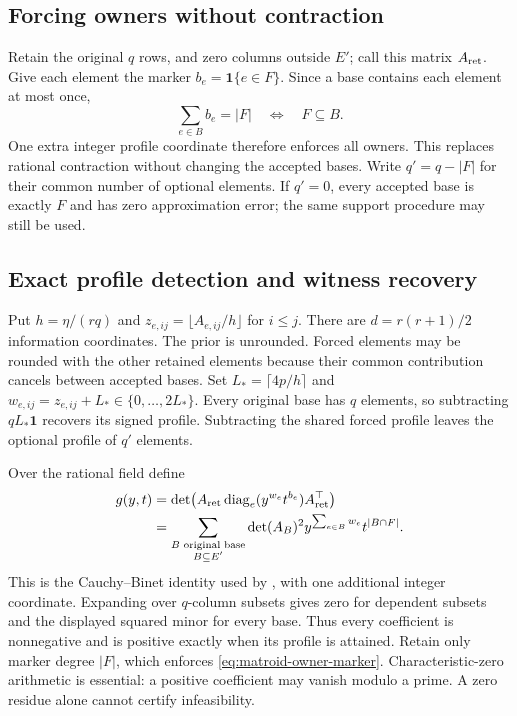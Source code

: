 \subsection{Forcing owners without contraction}
Retain the original $q$ rows, and zero columns outside $E'$; call this
matrix $A_{\rm ret}$. Give each element the marker
$b_e=\mathbf1\{e\in F\}$. Since a base contains each element at most once,
\begin{equation}
 \sum_{e\in B}b_e=|F|
 \quad\Longleftrightarrow\quad F\subseteq B.
 \label{eq:matroid-owner-marker}
\end{equation}
One extra integer profile coordinate therefore enforces all owners.
This replaces rational contraction without changing the accepted bases.
Write $q'=q-|F|$ for their common number of optional elements. If $q'=0$,
every accepted base is exactly $F$ and has zero approximation error; the
same support procedure may still be used.

\subsection{Exact profile detection and witness recovery}
Put $h=\eta/(rq)$ and $z_{e,ij}=\lfloor A_{e,ij}/h\rfloor$ for $i\le j$.
There are $d=r(r+1)/2$ information coordinates. The prior is unrounded.
Forced elements may be rounded with the other retained elements because
their common contribution cancels between accepted bases. Set
$L_* =\lceil4p/h\rceil$ and
$w_{e,ij}=z_{e,ij}+L_*\in\{0,\ldots,2L_*\}$.
Every original base has $q$ elements, so subtracting $qL_*\mathbf1$
recovers its signed profile. Subtracting the shared forced profile leaves
the optional profile of $q'$ elements.

Over the rational field define
\begin{equation}
\begin{split}
 g(y,t)&=\det\!\left(A_{\rm ret}
               \operatorname{diag}_e(y^{w_e}t^{b_e})A_{\rm ret}^{\top}\right)\\
 &=\sum_{\substack{B\text{ original base}\\B\subseteq E'}}
       \det(A_B)^2 y^{\sum_{e\in B}w_e}t^{|B\cap F|}.
\end{split}
 \label{eq:matroid-profile-polynomial}
\end{equation}
This is the Cauchy--Binet identity used by
\citet[Lemmas 4.3--4.4]{Berstein2008}, with one additional integer
coordinate. Expanding over $q$-column subsets gives zero for dependent
subsets and the displayed squared minor for every base. Thus every
coefficient is nonnegative and is positive exactly when its profile is
attained. Retain only marker degree $|F|$, which enforces
\eqref{eq:matroid-owner-marker}. Characteristic-zero arithmetic is essential:
a positive coefficient may vanish modulo a prime. A zero residue alone
cannot certify infeasibility.

